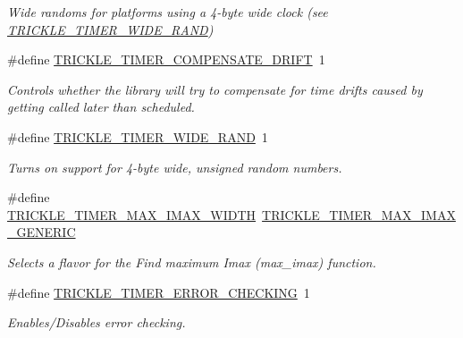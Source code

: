 \begin{DoxyCompactItemize}
\begin{DoxyCompactList}\small\item\em Wide randoms for platforms using a 4-\/byte wide clock (see \hyperlink{group__trickle-timer_ga2b3b9fd1a895243db18b35b7600bac15}{T\+R\+I\+C\+K\+L\+E\+\_\+\+T\+I\+M\+E\+R\+\_\+\+W\+I\+D\+E\+\_\+\+R\+A\+N\+D}) \end{DoxyCompactList}\item 
\#define \hyperlink{group__trickle-timer_ga361fa866c3bba8e5a05de3b957bc04c1}{T\+R\+I\+C\+K\+L\+E\+\_\+\+T\+I\+M\+E\+R\+\_\+\+C\+O\+M\+P\+E\+N\+S\+A\+T\+E\+\_\+\+D\+R\+I\+F\+T}~1
\begin{DoxyCompactList}\small\item\em Controls whether the library will try to compensate for time drifts caused by getting called later than scheduled. \end{DoxyCompactList}\item 
\#define \hyperlink{group__trickle-timer_ga2b3b9fd1a895243db18b35b7600bac15}{T\+R\+I\+C\+K\+L\+E\+\_\+\+T\+I\+M\+E\+R\+\_\+\+W\+I\+D\+E\+\_\+\+R\+A\+N\+D}~1
\begin{DoxyCompactList}\small\item\em Turns on support for 4-\/byte wide, unsigned random numbers. \end{DoxyCompactList}\item 
\#define \hyperlink{group__trickle-timer_ga157285503882e567c275871fd30d3016}{T\+R\+I\+C\+K\+L\+E\+\_\+\+T\+I\+M\+E\+R\+\_\+\+M\+A\+X\+\_\+\+I\+M\+A\+X\+\_\+\+W\+I\+D\+T\+H}~\hyperlink{group__trickle-timer_ga63607c0782cac7d825d07bff8c89b3d4}{T\+R\+I\+C\+K\+L\+E\+\_\+\+T\+I\+M\+E\+R\+\_\+\+M\+A\+X\+\_\+\+I\+M\+A\+X\+\_\+\+G\+E\+N\+E\+R\+I\+C}
\begin{DoxyCompactList}\small\item\em Selects a flavor for the \textquotesingle{}Find maximum Imax\textquotesingle{} (max\+\_\+imax) function. \end{DoxyCompactList}\item 
\#define \hyperlink{group__trickle-timer_gad47a05440295b6f171873f5f43384e56}{T\+R\+I\+C\+K\+L\+E\+\_\+\+T\+I\+M\+E\+R\+\_\+\+E\+R\+R\+O\+R\+\_\+\+C\+H\+E\+C\+K\+I\+N\+G}~1
\begin{DoxyCompactList}\small\item\em Enables/\+Disables error checking. \end{DoxyCompactList}\end{DoxyCompactItemize}
